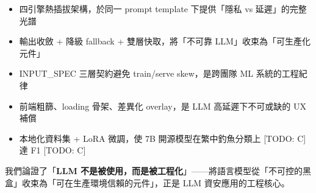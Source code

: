 \documentclass[11pt, a4paper]{article}
\begin{document}
\begin{itemize}[leftmargin=2em]
  \item 四引擎熱插拔架構，於同一 prompt template 下提供「隱私 vs 延遲」的完整光譜
  \item 輸出收斂 + 降級 fallback + 雙層快取，將「不可靠 LLM」收束為「可生產化元件」
  \item INPUT\_SPEC 三層契約避免 train/serve skew，是跨團隊 ML 系統的工程紀律
  \item 前端粗篩、loading 骨架、差異化 overlay，是 LLM 高延遲下不可或缺的 UX 補償
  \item 本地化資料集 + LoRA 微調，使 7B 開源模型在繁中釣魚分類上 [TODO: C] 達 F1 [TODO: C]
\end{itemize}

我們論證了「\textbf{LLM 不是被使用，而是被工程化}」——將語言模型從「不可控的黑盒」收束為「可在生產環境信賴的元件」，正是 LLM 資安應用的工程核心。



\end{document}
